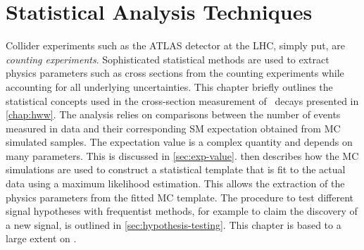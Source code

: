 \chapter{Statistical Analysis Techniques}
\label{chap:statistics}
Collider experiments such as the ATLAS detector at the LHC, simply put, are \emph{counting experiments}.
Sophisticated statistical methods are used to extract physics parameters such as cross sections from the counting experiments while accounting for all underlying uncertainties. 
This chapter briefly outlines the statistical concepts used in the cross-section measurement of \HWW\ decays presented in \cref{chap:hww}.
The \HWW analysis relies on comparisons between the number of events measured in data and their corresponding SM expectation obtained from MC simulated samples. The expectation value is a complex quantity and depends on many parameters. This is discussed in \cref{sec:exp-value}.
 then describes how the MC simulations are used to construct a statistical template that is fit to the actual data using a maximum likelihood estimation. This allows the extraction of the physics parameters from the fitted MC template.
The procedure to test different signal hypotheses with frequentist methods, for example to claim the discovery of a new signal, is outlined in \cref{sec:hypothesis-testing}.
This chapter is based to a large extent on .

